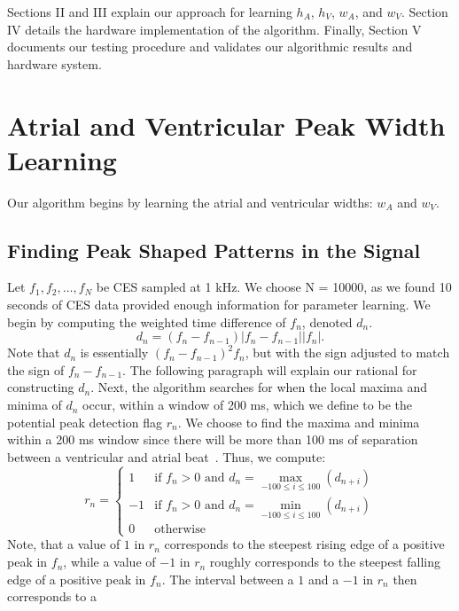 \documentclass[conference]{IEEEtran}
\newcommand{\APW}{\ensuremath{w_A}}
\newcommand{\VPW}{\ensuremath{w_V}}
\newcommand{\APH}{\ensuremath{h_A}}
\newcommand{\VPH}{\ensuremath{h_V}}
\begin{document}
Sections II and III explain our approach
for learning \APH{}, \VPH{}, \APW{}, and \VPW{}. Section IV
details the hardware implementation of the algorithm.
Finally, Section V documents our testing procedure and
validates our algorithmic results and hardware system.

\section{Atrial and Ventricular Peak Width Learning}
Our algorithm begins by learning the atrial and ventricular widths: \APW{} and \VPW{}.

\subsection{Finding Peak Shaped Patterns in the Signal}
Let $f_1, f_2, \dots, f_{N}$ be CES sampled at 1 kHz.
We choose N = 10000, as we found 10 seconds of CES data provided enough information for parameter learning.
We begin by computing the weighted time
difference of $f_n$, denoted $d_n$.
\begin{equation*}
	d_n=(f_n-f_{n-1})\left|f_n - f_{n-1}\right| \left|f_n\right|.
\end{equation*}
Note that $d_n$ is essentially $(f_n-f_{n-1})^2  f_n$, but with the sign adjusted to match the sign of $f_n-f_{n-1}$.
The following paragraph will explain our rational for constructing $d_n$. Next, the algorithm 
searches for when the local
maxima and minima of $d_n$ occur, within a window of
200 ms, which we define to be the potential peak detection flag $r_n$.  
We choose to find the maxima and minima within a 200 ms window since there will be more than 100 ms of separation between a ventricular 
and atrial beat~\cite{cardiac-cycle}. Thus, we compute:
\begin{equation*}
	r_n = \left \{
		\begin{array}{lc}
			1 & \text{if } f_n>0 \text{ and } d_n = \max\limits_{-100 \le i \le 100} (d_{n+i}) \\
			-1 & \text{if } f_n>0 \text{ and }  d_n = \min\limits_{-100 \le i \le 100} (d_{n+i}) \\
			0 & \text{otherwise}
		\end{array}
	\right.
\end{equation*}
Note, that a value of $1$ in $r_n$ corresponds to the
steepest rising edge of a positive peak in $f_n$, while a value of $-1$
in $r_n$ roughly corresponds to the steepest falling edge of a positive peak
in $f_n$. 
The interval between a $1$ and a $-1$ in $r_n$ then corresponds to a
\end{document}
